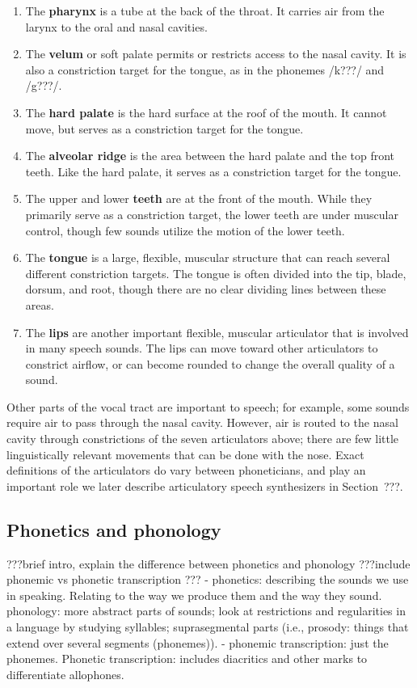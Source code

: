 \begin{enumerate}
\item The \textbf{pharynx} is a tube at the back of the throat.
  It carries air from the larynx to the oral and nasal cavities.
\item The \textbf{velum} or soft palate permits or restricts
  access to the nasal cavity. It is also a constriction target
  for the tongue, as in the phonemes /k???/ and /g???/.
\item The \textbf{hard palate} is the hard surface
  at the roof of the mouth. It cannot move, but serves
  as a constriction target for the tongue.
\item The \textbf{alveolar ridge} is the area between
  the hard palate and the top front teeth. Like the hard palate,
  it serves as a constriction target for the tongue.
\item The upper and lower \textbf{teeth} are at the front of the mouth.
  While they primarily serve as a constriction target,
  the lower teeth are under muscular control,
  though few sounds utilize the motion of the lower teeth.
\item The \textbf{tongue} is a large, flexible, muscular structure
  that can reach several different constriction targets.
  The tongue is often divided into the tip, blade, dorsum, and root,
  though there are no clear dividing lines between these areas.
\item The \textbf{lips} are another important flexible, muscular
  articulator that is involved in many speech sounds.
  The lips can move toward other articulators to constrict airflow,
  or can become rounded to change the overall quality of a sound.
\end{enumerate}

Other parts of the vocal tract are important to speech;
for example, some sounds require air
to pass through the nasal cavity.
However, air is routed to the nasal cavity
through constrictions of the seven articulators above;
there are few little linguistically relevant
movements that can be done with the nose.
Exact definitions of the articulators
do vary between phoneticians,
and play an important role
we later describe articulatory speech synthesizers
in Section~???.

\subsection{Phonetics and phonology}

???brief intro, explain the difference
between phonetics and phonology
???include phonemic vs phonetic transcription
??? - phonetics: describing the sounds we use in speaking.
  Relating to the way we produce them and the way they sound.
  phonology: more abstract parts of sounds; look at restrictions
  and regularities in a language by studying syllables;
  suprasegmental parts (i.e., prosody:
  things that extend over several segments (phonemes)).
  - phonemic transcription: just the phonemes. Phonetic transcription:
    includes diacritics and other marks to differentiate allophones.

